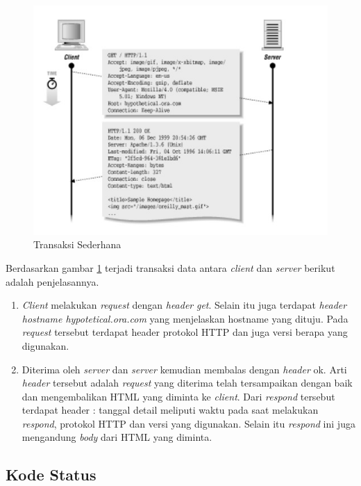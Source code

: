 			\begin{figure}[H]
				\centering		
				\includegraphics[scale=0.6]{Gambar/transaction.jpg}
				\caption[Transaksi sederhana]{Transaksi Sederhana\cite{wong2000http}}
				\label{fig:transaction}	
			\end{figure}
Berdasarkan gambar \ref{fig:transaction} terjadi transaksi data antara \textit{client} dan \textit{server} berikut adalah penjelasannya.
\begin{enumerate}
	\item \textit{Client} melakukan \textit{request} dengan \textit{header} \textit{get}. Selain itu juga terdapat \textit{header hostname hypotetical.ora.com} yang menjelaskan hostname yang dituju. Pada \textit{request} tersebut terdapat header protokol HTTP dan juga versi berapa yang digunakan. 
	\item Diterima oleh \textit{server} dan \textit{server} kemudian membalas dengan \textit{header} ok. Arti \textit{header} tersebut adalah \textit{request} yang diterima telah tersampaikan dengan baik dan mengembalikan HTML yang diminta ke \textit{client}. Dari \textit{respond} tersebut terdapat header : tanggal detail meliputi waktu pada saat melakukan \textit{respond}, protokol HTTP dan versi yang digunakan. Selain itu \textit{respond} ini juga mengandung \textit{body} dari HTML yang diminta.   
\end{enumerate}

\subsection{Kode Status}
\label{subsec:kodestatus}

